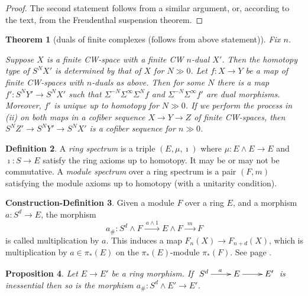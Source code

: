 \documentclass[11pt]{article}
\theoremstyle{plain}
\newtheorem{thm}{Theorem}[subsection]
\newtheorem{prop}[thm]{Proposition}
\theoremstyle{definition}
\newtheorem{condef}[thm]{Construction-Definition}
\newtheorem{defn}[thm]{Definition}
\begin{document}
{\begin{proof}
The second statement follows from a similar argument, or, according to the text,
from the Freudenthal suspension theorem.
\end{proof}
\begin{thm}[duals of finite complexes {\small(follows from above statement)}]
Fix $n$.
\begin{itemise}
\itm[(i)]Suppose $X$ is a finite CW-space with a finite CW $n$-dual $X'$. Then
the homotopy type of $S^NX'$ is determined by that of $X$ for $N\gg0$.
\itm[(ii)] Let $f:X\to Y$ be a map of finite CW-spaces with $n$-duals as above.
Then for some $N$ there is a map $f':S^NY'\to S^NX'$ such that
$\Sigma^{-N}\Sigma^\infty \Sigma^Nf$ and $\Sigma^{-N}\Sigma^\infty f'$ are dual
morphisms. Moreover, $f'$ is unique up to homotopy for $N\gg0$.
\itm[(iii)]If we perform the process in \textup{(ii)} on both maps in a cofiber
sequence $X\to Y\to Z$ of finite CW-spaces, then $S^NZ'\to S^NY'\to S^NX'$ is a
cofiber sequence for $n\gg0$.
\end{itemise}
\end{thm}
\begin{defn}
A \emph{ring spectrum} is a triple $(E,\mu,\imath)$ where $\mu:E\wedge E\to E$
and $\imath:S\to E$ satisfy the ring axioms up to homotopy. It may be or may not
be commutative. A \emph{module spectrum} over a ring spectrum is a pair $(F,m)$
satisfying the module axioms up to homotopy (with a unitarity condition).
\end{defn}
\setcounter{thm}{13}
\begin{condef}
Given a module $F$ over a ring $E$, and a morphism $a:S^d\to E$, the morphism
\[a_\#:S^d\wedge F\xrightarrow{\ a\wedge 1\ }
E\wedge F\xrightarrow{\ \ m\ \ } F\]
is called multiplication by $a$. This induces a map $F_n(X)\to F_{n+d}(X)$,
which is multiplication by $a\in\pi_*(E)$ on the $\pi_*(E)$-module $\pi_*(F)$.
See page \pageref{modulestructures}.
\end{condef}
\begin{prop}
Let $E\to E'$ be a ring morphism. If $\xymatrix{S^d\ar[r]^a&E\ar[r]&E'}$ is
inessential then so is the morphism $a_\#:S^d\wedge E'\to E'$.
\end{prop}
}   %
\end{document}
